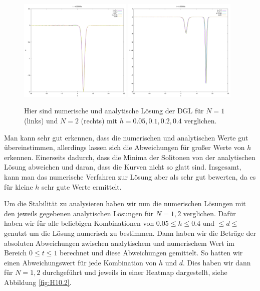 \documentclass[ngerman]{scrartcl}
\begin{document}
\begin{figure}[htbp]
	\centering
	\includegraphics[width=0.48\textwidth]{vergleichN1.png}
	\includegraphics[width=0.48\textwidth]{vergleichN2.png}
	\caption[Vergleich]{Hier sind numerische und analytische Lösung der DGL für $N=1$ (links) und $N=2$ (rechts) mit $h=0.05, 0.1, 0.2, 0.4$ verglichen.}
	\label{fig:H10.22}
\end{figure}

Man kann sehr gut erkennen, dass die numerischen und analytischen Werte gut übereinstimmen, allerdings lassen sich die Abweichungen für großer Werte von $h$ erkennen. Einerseits dadurch, dass die Minima der Solitonen von der analytischen Lösung abweichen und daran, dass die Kurven nicht so glatt sind. Insgesamt, kann man das numerische Verfahren zur Lösung aber als sehr gut bewerten, da es für kleine $h$ sehr gute Werte ermittelt.


Um die Stabilität zu analysieren haben wir nun die numerischen Lösungen mit den jeweils gegebenen analytischen Lösungen für $N=1,2$ verglichen. Dafür haben wir für alle beliebigen Kombinationen von $0.05 \le h \le 0.4$ und $\le d \le$ genutzt um die Lösung numerisch zu bestimmen. Dann haben wir die Beträge der absoluten Abweichungen zwischen analytischem und numerischem Wert im Bereich $0 \le t \le 1$ berechnet und diese Abweichungen gemittelt. So hatten wir einen Abweichungswert für jede Kombination von $h$ und $d$. Dies haben wir dann für $N=1,2$ durchgeführt und jeweils in einer Heatmap dargestellt, siehe Abbildung \ref{fig:H10.2}.
\end{document}
